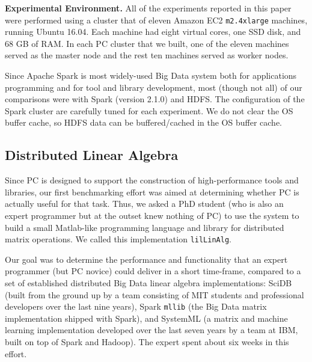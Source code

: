 \vspace{5pt}
\noindent
\textbf {Experimental Environment.} All of the experiments reported in this paper were performed using a
cluster that of eleven Amazon EC2 \texttt{m2.4xlarge} machines,
running Ubuntu 16.04. Each machine had eight virtual cores, one SSD
disk, and 68 GB of RAM. In each PC cluster that we built, one of the eleven machines served as the master
node and the rest ten machines served as worker nodes.

Since Apache Spark is most widely-used Big Data system both for applications programming and for tool and library
development, most
(though not all) of our comparisons were with Spark  (version
2.1.0) and HDFS. The configuration of the Spark cluster are carefully tuned for each
experiment. We do not clear the OS buffer cache, so HDFS data can be
buffered/cached in the OS buffer cache. 

\subsection {Distributed Linear Algebra}
Since PC is designed to support the construction
of high-performance tools and libraries, our first benchmarking effort was aimed at determining 
whether PC is actually useful for that task.  Thus, we asked
a PhD student (who is also an expert programmer but at the outset knew nothing of PC) 
to use the system to build a small Matlab-like 
programming language and library for distributed matrix operations.
We called this implementation \texttt{lilLinAlg}.

Our goal was to determine the 
performance and functionality that an expert programmer (but PC novice) could deliver in a short
time-frame, compared to a set of established distributed Big Data linear algebra implementations:
SciDB \cite{brown2010overview, stonebraker2011architecture} (built from the ground up by a team
consisting of MIT students and professional developers over the last
nine years), Spark \texttt{mllib} \cite{meng2016mllib} 
(the Big Data matrix
implementation shipped with Spark), and SystemML \cite{boehm2014hybrid, ghoting2011systemml, boehm2016systemml}
(a matrix and machine learning implementation developed
over the last seven years by a team at IBM, built on top of Spark and Hadoop).
The expert spent about six weeks in this effort.

